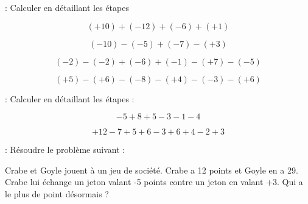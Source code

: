  : Calculer en détaillant les étapes

\begin{multicols}{2}
    $$(+10)+(-12)+(-6)+(+1)$$
    \vspace*{16em}

    $$(-10)-(-5)+(-7)-(+3)$$
    \vspace*{16em}\columnbreak

    $$(-2)-(-2)+(-6)+(-1)-(+7)-(-5)$$
    \vspace*{16em}

    $$(+5)-(+6)-(-8)-(+4)-(-3)-(+6)$$
    \vspace*{16em}
\end{multicols}

\newpage



 : Calculer en détaillant les étapes :

\begin{multicols}{2}
    $$-5+8+5-3-1-4$$
    \vspace*{16em}\columnbreak

    $$+12-7+5+6-3+6+4-2+3$$
    \vspace*{16em}

\end{multicols}

 : Résoudre le problème suivant :

Crabe et Goyle jouent à un jeu de société. Crabe a 12 points et Goyle en a 29.
Crabe lui échange un jeton valant -5 points contre un jeton en valant +3. 
Qui a le plus de point désormais ?

